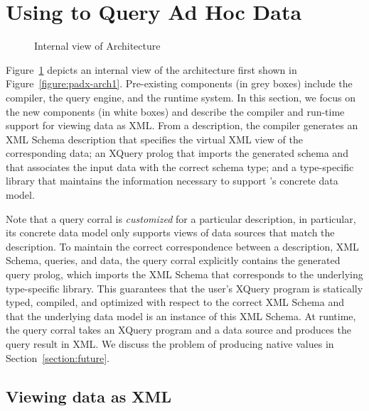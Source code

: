 \section{Using \padx{} to Query Ad Hoc Data}
\label{section:padx}

\begin{figure}
\begin{center}
\end{center}
\caption{Internal view of \padx{} Architecture}
\label{figure:padx-arch}
\end{figure}

Figure~\ref{figure:padx-arch} depicts an internal view of the \padx{}
architecture first shown in Figure~\ref{figure:padx-arch1}.
Pre-existing components (in grey boxes) include the \pads{} compiler,
the \Galax{} query engine, and the \pads{} runtime system.  In this
section, we focus on the new components (in white boxes) and describe
the compiler and run-time support for viewing \pads{} data as XML.
From a \pads{} description, the compiler generates an XML Schema
description that specifies the virtual XML view of the corresponding
\pads{} data; an XQuery prolog that imports the generated schema and
that associates the input data with the correct schema type; and a
type-specific library that maintains the information necessary to
support \padx{}'s concrete data model.  

Note that a query corral is \emph{customized} for a particular \pads{}
description, in particular, its concrete data model only supports
views of data sources that match the \pads{} description.  To maintain
the correct correspondence between a description, XML Schema, queries,
and data, the query corral explicitly contains the generated query
prolog, which imports the XML Schema that corresponds to the
underlying type-specific library.  This guarantees that the user's
XQuery program is statically typed, compiled, and optimized with
respect to the correct XML Schema and that the underlying data model
is an instance of this XML Schema.  At runtime, the query corral takes
an XQuery program and a \pads{} data source and produces the query
result in XML.  We discuss the problem of producing native \pads{}
values in Section~\ref{section:future}.

\subsection{Viewing \pads{} data as XML}	

